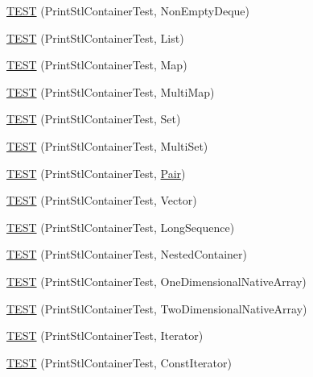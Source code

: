 \begin{DoxyCompactItemize}
\item 
\hyperlink{namespacetesting_1_1gtest__printers__test_a249d482cf4a1525bd043489dcbd3e200}{T\+E\+ST} (Print\+Stl\+Container\+Test, Non\+Empty\+Deque)
\item 
\hyperlink{namespacetesting_1_1gtest__printers__test_aaa135672ff79ecaef82c6046f2ab8d29}{T\+E\+ST} (Print\+Stl\+Container\+Test, List)
\item 
\hyperlink{namespacetesting_1_1gtest__printers__test_a3d701a1866f260a42411e9041894c49c}{T\+E\+ST} (Print\+Stl\+Container\+Test, Map)
\item 
\hyperlink{namespacetesting_1_1gtest__printers__test_a8a498c956a5b1c0358d126e1ad56fac0}{T\+E\+ST} (Print\+Stl\+Container\+Test, Multi\+Map)
\item 
\hyperlink{namespacetesting_1_1gtest__printers__test_abdc498462741033074f8e86b7c0bd480}{T\+E\+ST} (Print\+Stl\+Container\+Test, Set)
\item 
\hyperlink{namespacetesting_1_1gtest__printers__test_adaa3e1cfa3feca377b3958edb41fc0f1}{T\+E\+ST} (Print\+Stl\+Container\+Test, Multi\+Set)
\item 
\hyperlink{namespacetesting_1_1gtest__printers__test_ad5d3e873b00c1c9e3f5924e106dd7831}{T\+E\+ST} (Print\+Stl\+Container\+Test, \hyperlink{namespacetesting_ac7520de8af26d3085513eeeb68561889}{Pair})
\item 
\hyperlink{namespacetesting_1_1gtest__printers__test_abfab1ea62f0285c0cdbcca500be0dac8}{T\+E\+ST} (Print\+Stl\+Container\+Test, Vector)
\item 
\hyperlink{namespacetesting_1_1gtest__printers__test_a55eca253f3365ad26183bcc711cb257a}{T\+E\+ST} (Print\+Stl\+Container\+Test, Long\+Sequence)
\item 
\hyperlink{namespacetesting_1_1gtest__printers__test_ad8fb463805baecdfb95154dec6ec4f27}{T\+E\+ST} (Print\+Stl\+Container\+Test, Nested\+Container)
\item 
\hyperlink{namespacetesting_1_1gtest__printers__test_a6dd59bbdea483f662fe62e2c55c106ce}{T\+E\+ST} (Print\+Stl\+Container\+Test, One\+Dimensional\+Native\+Array)
\item 
\hyperlink{namespacetesting_1_1gtest__printers__test_aca371c218e2248562ed258eaf385f4d1}{T\+E\+ST} (Print\+Stl\+Container\+Test, Two\+Dimensional\+Native\+Array)
\item 
\hyperlink{namespacetesting_1_1gtest__printers__test_a01ec32faf0032f9fbcf4895d8d6e4aa9}{T\+E\+ST} (Print\+Stl\+Container\+Test, Iterator)
\item 
\hyperlink{namespacetesting_1_1gtest__printers__test_a3b54f9a039804190b7ff2e818169c0f2}{T\+E\+ST} (Print\+Stl\+Container\+Test, Const\+Iterator)

\end{DoxyCompactItemize}
